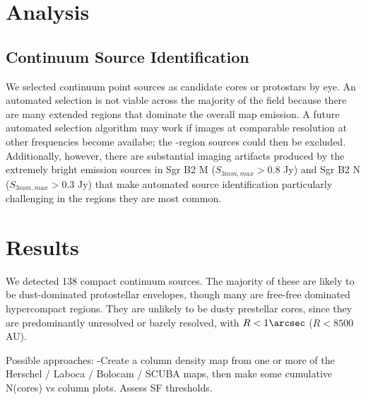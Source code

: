 \newcommand{\ncores}{138\xspace}



\section{Analysis}

\subsection{Continuum Source Identification}
We selected continuum point sources as candidate cores or protostars by eye.
An automated selection is not viable across the majority of the field because
there are many extended \hii regions that dominate the overall map emission.  A
future automated selection algorithm may work if images at comparable
resolution at other frequencies become availabe; the \hii-region sources could
then be excluded.  Additionally, however, there are substantial imaging
artifacts produced by the extremely bright emission sources in Sgr B2 M ($S_{3
mm,max} > 0.8$ Jy) and Sgr B2 N ($S_{3 mm,max} > 0.3$ Jy) that make automated
source identification particularly challenging in the regions they are most
common.

\section{Results}
We detected \ncores compact continuum sources.  The majority of these are
likely to be dust-dominated protostellar envelopes, though many are free-free
dominated hypercompact \hii regions.  They are unlikely to be dusty prestellar
cores, since they are predominantly unresolved or barely resolved, with
$R<1\arcsec$ ($R<8500$ AU).


Possible approaches:
-Create a column density map from one or more of the Herschel / Laboca / Bolocam / SCUBA maps,
then make some cumulative N(cores) vs column plots.  Assess SF thresholds.


